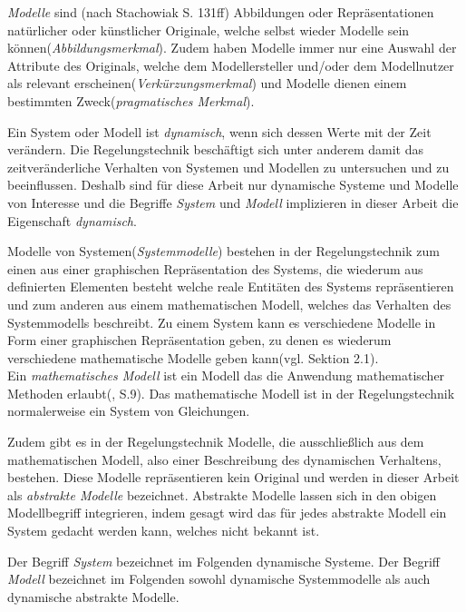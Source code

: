 \textit{Modelle} sind (nach Stachowiak\cite{STA73} S. 131ff) Abbildungen oder Repräsentationen natürlicher oder künstlicher Originale, welche selbst wieder Modelle sein können(\textit{Abbildungsmerkmal}). Zudem haben Modelle immer nur eine Auswahl der Attribute des Originals, welche dem Modellersteller und/oder dem Modellnutzer als relevant erscheinen(\textit{Verkürzungsmerkmal}) und Modelle dienen einem bestimmten Zweck(\textit{pragmatisches Merkmal}). 

Ein System oder Modell ist \textit{dynamisch}, wenn sich dessen Werte mit der Zeit verändern. Die Regelungstechnik beschäftigt sich unter anderem damit das zeitveränderliche Verhalten von Systemen und Modellen zu untersuchen und zu beeinflussen. Deshalb sind für diese Arbeit nur dynamische Systeme und Modelle von Interesse und die Begriffe \textit{System} und \textit{Modell} implizieren in dieser Arbeit die Eigenschaft \textit{dynamisch}. 

Modelle von Systemen(\textit{Systemmodelle}) bestehen in der Regelungstechnik zum einen aus einer graphischen Repräsentation des Systems, die wiederum aus definierten Elementen besteht welche reale Entitäten des Systems repräsentieren und zum anderen aus einem mathematischen Modell, welches das Verhalten des Systemmodells beschreibt. Zu einem System kann es verschiedene Modelle in Form einer graphischen Repräsentation geben, zu denen es wiederum verschiedene mathematische Modelle geben kann(vgl. \cite{LUD95} Sektion 2.1).\\
Ein \textit{mathematisches Modell} ist ein Modell das die Anwendung mathematischer Methoden erlaubt(\cite{GRVO16}, S.9). Das mathematische Modell ist in der Regelungstechnik normalerweise ein System von Gleichungen. 

Zudem gibt es in der Regelungstechnik Modelle, die ausschließlich aus dem mathematischen Modell, also einer Beschreibung des dynamischen Verhaltens, bestehen. Diese Modelle repräsentieren kein Original und werden in dieser Arbeit als \textit{abstrakte Modelle} bezeichnet. Abstrakte Modelle lassen sich in den obigen Modellbegriff integrieren, indem gesagt wird das für jedes abstrakte Modell ein System gedacht werden kann, welches nicht bekannt ist. 

Der Begriff \textit{System} bezeichnet im Folgenden dynamische Systeme. Der Begriff \textit{Modell} bezeichnet im Folgenden sowohl dynamische Systemmodelle als auch dynamische abstrakte Modelle.

